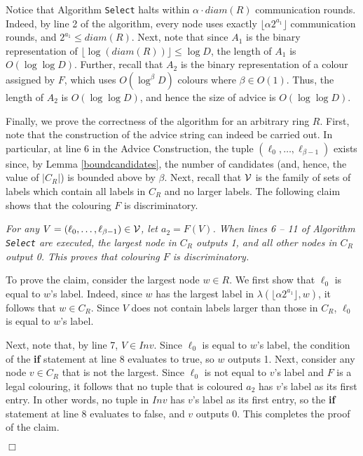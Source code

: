 \documentclass[11pt]{article}
\newcommand{\qed}{\hfill $\Box$ \bigbreak}
\newenvironment{proof}{\noindent {\bf Proof.}}{\qed}
\newcommand{\diam}[1]{\ensuremath{{diam}(#1)}}
\newcommand{\candidates}[1]{\ensuremath{C_{#1}}}
\newcommand{\maxcandidates}{\ensuremath{\beta}}
\begin{document}
\begin{proof}
Notice that Algorithm {\tt Select} halts within  $\alpha\cdot\diam{R}$ communication rounds. Indeed, 
by line 2 of the algorithm, every node uses exactly $\lfloor \alpha 2^{a_1} \rfloor$ communication rounds, 
and $2^{a_1} \leq \diam{R}$. Next, note that since $A_1$ is the binary representation of $\lfloor \log(\diam{R}) \rfloor \leq \log D$, the length of $A_1$ is $O(\log\log D)$. Further, recall that $A_2$ is the binary representation of a colour assigned by $F$, which uses $O(\log^{\maxcandidates} D)$ colours where $\maxcandidates \in O(1)$. Thus, the length of $A_2$ is $O(\log\log D)$, and hence the size of advice is  $O(\log\log D)$.



Finally, we prove the correctness of the algorithm for an arbitrary ring $R$. First, note that the construction of the advice string can indeed be carried out. In particular, at line 6 in the Advice Construction, the tuple $(\ell_0,\ldots,\ell_{\maxcandidates-1})$ exists since, by Lemma \ref{boundcandidates}, the number of candidates (and, hence, the value of $|\candidates{R}|$) is bounded above by $\maxcandidates$. Next, recall that $\cal V$ is the family of sets  of labels which contain all labels in $C_R$ and no larger labels. The following claim shows that the colouring $F$ is discriminatory.
 








\vspace{3mm} 
\textit{For any $V= (\ell_0,\ldots,\ell_{\maxcandidates-1}) \in \cal V$, let $a_2 = F(V)$. When lines 6 -- 11 of Algorithm {\tt Select} are executed, the largest node in $\candidates{R}$ outputs 1, and all other nodes in $\candidates{R}$ output 0. This proves that colouring $F$ is discriminatory.}
\vspace{3mm}

To prove the claim, consider the largest node $w \in R$. We first show that $\ell_0$ is equal to $w$'s label. Indeed, since $w$ has the largest label in $\lambda(\lfloor\alpha 2^{a_1}\rfloor,w)$, it follows that $w \in \candidates{R}$. Since $V$ does not contain labels larger than those in $C_R$, $\ell_0$ is equal to $w$'s label.

Next, note that, by line 7, $V \in Inv$. Since $\ell _0$ is equal to $w$'s label, the condition of the \textbf{if} statement at line 8 evaluates to true, so $w$ outputs 1. Next, consider any node $v \in C_R$ that is not the largest.
Since $\ell _0$ is not equal to $v$'s label and $F$ is a legal colouring, it follows that no tuple that is coloured $a_2$ has $v$'s label as its first entry. In other words, no tuple in $Inv$ has $v$'s label as its first entry, so the \textbf{if} statement at line 8 evaluates to false, and $v$ outputs 0. This completes the proof of the claim.


\end{proof}
\end{document}
